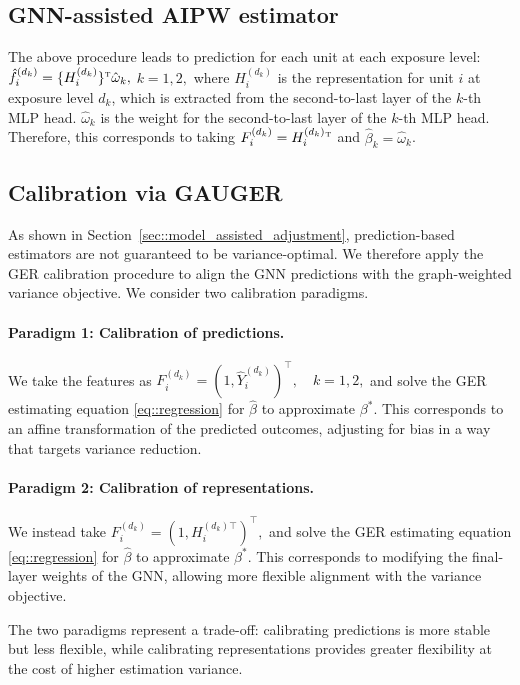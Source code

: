 \documentclass[twoside,letterpaper]{article}
\theoremstyle{plain}
\theoremstyle{definition}
\theoremstyle{remark}
\def\T{{\textsc{t}}}
\begin{document}
\subsection{GNN-assisted AIPW estimator}
The above procedure leads to prediction for each unit at each exposure level: $\hat{f}_i^{(d_k)} = \{H_i^{(d_k)}\}{}^\T \hat{\omega}_k,$ $k=1,2,$ 
where $H_i^{(d_k)}$ is the representation for unit $i$ at exposure level $d_k$, which is extracted from the second-to-last layer of the $k$-th MLP head. $\hat{\omega}_k$ is the weight for the second-to-last layer of the $k$-th MLP head. Therefore, this corresponds to taking $F_i^{(d_k)} = H_i^{(d_k)}{}^\T$ and $\hat\beta_k = \hat{\omega}_k$.

\subsection{Calibration via GAUGER}

As shown in Section~\ref{sec::model_assisted_adjustment}, prediction-based estimators are not guaranteed to be variance-optimal. We therefore apply the GER calibration procedure to align the GNN predictions with the graph-weighted variance objective. We consider two calibration paradigms.

\paragraph{Paradigm 1: Calibration of predictions.}
We take the features as
$
F_i^{(d_k)} = (1, \hat{Y}_i^{(d_k)})^\top, \quad k=1,2,$
and solve the GER estimating equation \eqref{eq::regression} for $\hat\beta$ to approximate $\beta^*$. This corresponds to an affine transformation of the predicted outcomes, adjusting for bias in a way that targets variance reduction.

\paragraph{Paradigm 2: Calibration of representations.}
We instead take
$
F_i^{(d_k)} = (1, H_i^{(d_k)\top})^\top,$
and solve the GER estimating equation \eqref{eq::regression} for $\hat\beta$ to approximate $\beta^*$. This corresponds to modifying the final-layer weights of the GNN, allowing more flexible alignment with the variance objective.

The two paradigms represent a trade-off: calibrating predictions is more stable but less flexible, while calibrating representations provides greater flexibility at the cost of higher estimation variance.
\end{document}
